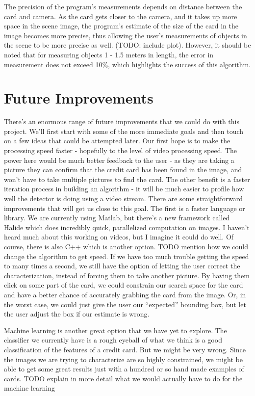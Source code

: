 \documentclass[10pt,twocolumn,letterpaper]{article}
\begin{document}
	The precision of the program’s measurements depends on distance between the card and camera. As the card gets closer to the camera, and it takes up more space in the scene image, the program’s estimate of the size of the card in the image becomes more precise, thus allowing the user’s measurements of objects in the scene to be more precise as well. (TODO: include plot). However, it should be noted that for measuring objects 1 - 1.5 meters in length, the error in measurement does not exceed 10\%, which highlights the success of this algorithm. 
	
\section{Future Improvements}
There’s an enormous range of future improvements that we could do with this project. We’ll first start with some of the more immediate goals and then touch on a few ideas that could be attempted later. Our first hope is to make the processing speed faster - hopefully to the level of video processing speed. The power here would be much better feedback to the user - as they are taking a picture they can confirm that the credit card has been found in the image, and won’t have to take multiple pictures to find the card. The other benefit is a faster iteration process in building an algorithm - it will be much easier to profile how well the detector is doing using a video stream. There are some straightforward improvements that will get us close to this goal. The first is a faster language or library. We are currently using Matlab, but there’s a new framework called Halide which does incredibly quick, parallelized computation on images. I haven’t heard much about this working on videos, but I imagine it could do well. Of course, there is also C++ which is another option. TODO mention how we could change the algorithm to get speed.
If we have too much trouble getting the speed to many times a second, we still have the option of letting the user correct the characterization, instead of forcing them to take another picture. By having them click on some part of the card, we could constrain our search space for the card and have a better chance of accurately grabbing the card from the image. Or, in the worst case, we could just give the user our “expected” bounding box, but let the user adjust the box if our estimate is wrong.

Machine learning is another great option that we have yet to explore. The classifier we currently have is a rough eyeball of what we think is a good classification of the features of a credit card. But we might be very wrong. Since the images we are trying to characterize are so highly constrained, we might be able to get some great results just with a hundred or so hand made examples of cards. TODO explain in more detail what we would actually have to do for the machine learning
\end{document}
